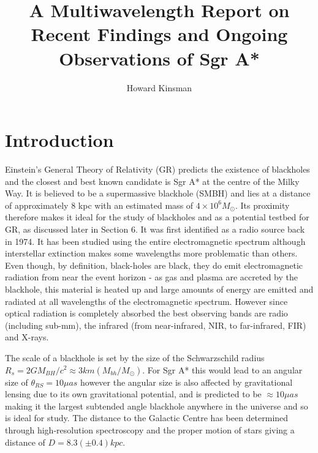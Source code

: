 \documentclass[a4paper,12pt]{article}
\author{Howard Kinsman}
\title{A Multiwavelength Report on Recent Findings and Ongoing Observations of Sgr A*}
\begin{document}
\maketitle
\section{Introduction}
Einstein's General Theory of Relativity (GR) predicts the existence of blackholes and the closest and best known candidate is Sgr A* at the centre of the Milky Way. It is believed to be a supermassive 
blackhole (SMBH) and lies at a distance of approximately 8 kpc with an estimated mass of $4\times10^6 M_{\odot}$. Its proximity therefore makes it ideal for the study of blackholes and as a 
potential testbed for GR, as discussed later in Section 6.
It was first identified as a radio source \citep{balick} back in 1974. It has been studied using the entire electromagnetic spectrum although interstellar extinction makes some wavelengths more 
problematic than others.
Even though, by definition, black-holes are black, they do emit electromagnetic radiation from near the event horizon - as gas and plasma are accreted by the blackhole, this material is heated up
and large amounts of energy are emitted and radiated at all wavelengths of the electromagnetic spectrum. However since optical radiation is completely absorbed the best observing bands are radio 
(including sub-mm), the infrared (from near-infrared, NIR, to  far-infrared, FIR) and X-rays.

The scale of a blackhole is set by the size of the Schwarzschild radius $R_s=2GM_{BH}/c^2\approx 3km (M_{bh}/M_{\odot})$. For Sgr A* this would lead to an angular size of $\theta_{RS}=10\mu as$ 
 however the angular size is also affected by gravitational lensing due to its own gravitational potential, and is predicted to be $\approx 10 \mu as$ making it the largest 
subtended angle blackhole anywhere in the universe and so is ideal for study. 
The distance to the Galactic Centre has been determined through high-resolution spectroscopy and the proper motion of stars giving a distance of $D=8.3(\pm 0.4) kpc$.
\end{document}
